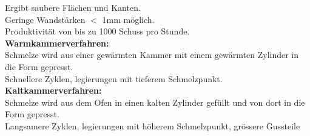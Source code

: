 Ergibt saubere Flächen und Kanten.\\
Geringe Wandstärken $<$ 1mm möglich.\\
Produktivität von bis zu 1000 Schuss pro Stunde.\\

\textbf{Warmkammerverfahren:}\\
Schmelze wird aus einer gewärmten Kammer mit einem gewärmten Zylinder in die Form gepresst.\\
Schnellere Zyklen, legierungen mit tieferem Schmelzpunkt.\\

\textbf{Kaltkammerverfahren:}\\
Schmelze wird aus dem Ofen in einen kalten Zylinder gefüllt und von dort in die Form gepresst.\\
Langsamere Zyklen, legierungen mit höherem Schmelzpunkt, grössere Gussteile\\